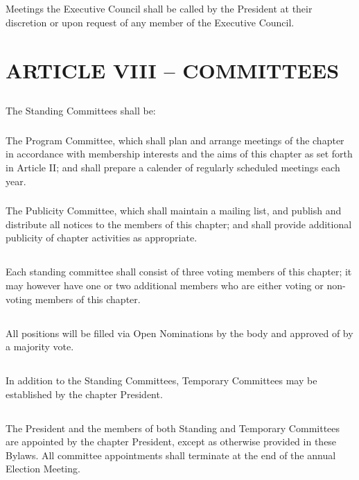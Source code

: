 \documentclass[12pt]{article}
\begin{document}
\subsection{}	Meetings the Executive Council shall be called by the President at their discretion or upon request of any member of the Executive Council.

\section{ARTICLE VIII – COMMITTEES}
\subsection{}	The Standing Committees shall be:
\subsubsection{}	The Program Committee, which shall plan and arrange meetings of the chapter in accordance with membership interests and the aims of this chapter as set forth in Article II; and shall prepare a calender of regularly scheduled meetings each year.
\subsubsection{}	The Publicity Committee, which shall maintain a mailing list, and publish and distribute all notices to the members of this chapter; and shall provide additional publicity of chapter activities as appropriate.
\subsection{}	Each standing committee shall consist of three voting members of this chapter; it may however have one or two additional members who are either voting or non-voting members of this chapter.
\subsection{}	All positions will be filled via Open Nominations by the body and approved of by a majority vote.
\subsection{}	In addition to the Standing Committees, Temporary Committees may be established by the chapter President.
\subsection{}	The President and the members of both Standing and Temporary Committees are appointed by the chapter President, except as otherwise provided in these Bylaws. All committee appointments shall terminate at the end of the annual Election Meeting.
\end{document}
